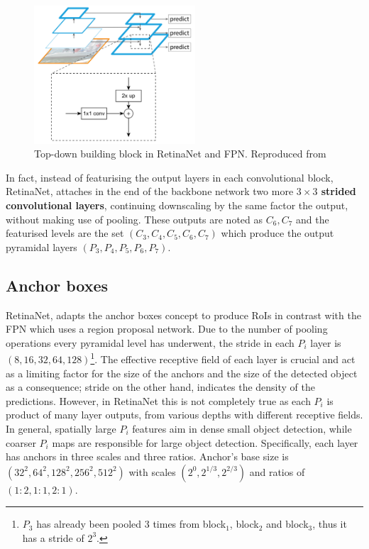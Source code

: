 \begin{figure}[!htb]
  \centering
  \includegraphics[width=6cm]{images/ch2/fig10.png}
  \caption{Top-down building block in RetinaNet and FPN. Reproduced from \cite{lin2017feature}}
  \label{fig10}
\end{figure} 

In fact, instead of featurising the output layers in each convolutional block, RetinaNet, attaches in the end of the backbone network two more \textbf{$3\times3$ strided convolutional layers}, continuing downscaling by the same factor the output, without making use of pooling. These outputs are noted as $C_6,C_7$ and the featurised levels are the set $(C_3, C_4, C_5, C_6, C_7)$ which produce the output pyramidal layers $(P_3, P_4, P_5, P_6, P_7)$.

\subsection{Anchor boxes}
RetinaNet, adapts the anchor boxes concept to produce RoIs in contrast with the FPN which uses a region proposal network. Due to the number of pooling operations every pyramidal level has underwent, the stride in each $P_i$ layer is $(8, 16, 32, 64, 128)$\footnote{$P_3$ has already been pooled 3 times from block$_1$, block$_2$ and block$_3$, thus it has a stride of $2^3$.}. The effective receptive field of each layer is crucial and act as a limiting factor for the size of the anchors and the size of the detected object as a consequence; stride on the other hand, indicates the density of the predictions. However, in RetinaNet this is not completely true as each $P_i$ is product of many layer outputs, from various depths with different receptive fields. In general, spatially large $P_i$ features aim in dense small object detection, while coarser $P_i$ maps are responsible for large object detection. Specifically, each layer has anchors in three scales and three ratios. Anchor's base size is $(32^2, 64^2, 128^2, 256^2, 512^2)$ with scales $(2^0, 2^{1/3}, 2^{2/3})$ and ratios of $(1\!:\!2,1\!:\!1,2\!:\!1)$.

